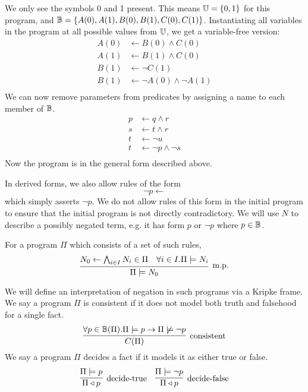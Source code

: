 We only see the symbols 0 and 1 present.
This means $\mathbb{U} = \{0, 1\}$ for this program, and $\mathbb{B} = \{A(0), A(1), B(0), B(1), C(0), C(1)\}$.
Instantiating all variables in the program at all possible values from $\mathbb{U}$, we get a variable-free version:
\begin{align*}
A(0) &\leftarrow B(0) \wedge C(0)\\
A(1) &\leftarrow B(1) \wedge C(0)\\
B(1) &\leftarrow \neg C(1)\\
B(1) &\leftarrow \neg A(0) \wedge \neg A(1)\\
\end{align*}
We can now remove parameters from predicates by assigning a name to each member of $\mathbb{B}$.
\begin{align*}
p &\leftarrow q \wedge r\\
s &\leftarrow t \wedge r\\
t &\leftarrow \neg u\\
t &\leftarrow \neg p \wedge \neg s\\
\end{align*}
Now the program is in the general form described above.

In derived forms, we also allow rules of the form
\[
	\neg p \leftarrow
\]
which simply asserts $\neg p$.
We do not allow rules of this form in the initial program to ensure that the initial program is not directly contradictory.
We will use $N$ to describe a possibly negated term, e.g. it has form $p$ or $\neg p$ where $p \in \mathbb{B}$.

For a program $\Pi$ which consists of a set of such rules,
\[
	\infer[\textrm{m.p.}]{\Pi \models N_0}{N_0 \leftarrow \bigwedge_{i \in I} N_i \in \Pi & \forall i \in I. \Pi \models N_i}
\]

We will define an interpretation of negation in such programs via a Kripke frame.
We say a program $\Pi$ is consistent if it does not model both truth and falsehood for a single fact.
\[
	\infer[\textrm{consistent}]{\cons{\Pi}}{\forall p \in \hb(\Pi). \Pi \models p \imp \Pi \not \models \neg p}
\]
We say a program $\Pi$ decides a fact if it models it as either true or false.
\[
	\infer[\textrm{decide-true}]{\Pi \decides p}{\Pi \models p}
	\quad
	\infer[\textrm{decide-false}]{\Pi \decides p}{\Pi \models \neg p}
\]

